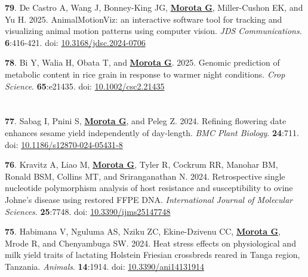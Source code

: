 \documentclass[margin,line,10pt]{res}
\newenvironment{list1}{
  \begin{list}{\ding{113}}{%
      \setlength{\itemsep}{0in}
      \setlength{\parsep}{0in} \setlength{\parskip}{0in}
      \setlength{\topsep}{0in} \setlength{\partopsep}{0in} 
      \setlength{\leftmargin}{0.17in}}}{\end{list}}
\begin{document}
\begin{resume}
\begin{list1}
  \vspace{0.5cm}

  \item [{\bf 79}.] De Castro A, Wang J, Bonney-King JG, \textbf{\underline{Morota G}}, Miller-Cushon EK, and Yu H. 2025. AnimalMotionViz: an interactive software tool for tracking and visualizing animal motion patterns using computer vision. \emph{JDS Communications}. \textbf{6}:416-421. doi: \textcolor{blue}{\href{https://doi.org/10.3168/jdsc.2024-0706}{10.3168/jdsc.2024-0706}}


  \vspace{0.5cm}

\item  [{\bf 78}.] Bi Y, Walia H, Obata T, and \textbf{\underline{Morota G}}. 2025. Genomic prediction of metabolic content in rice grain in response to warmer night conditions. \emph{Crop Science}. \textbf{65}:e21435. doi: \textcolor{blue}{\href{https://doi.org/10.1002/csc2.21435}{10.1002/csc2.21435}}

\end{list1}



\section{}
\begin{list1}


  \item  [{\bf 77}.]  Sabag I, Pnini S, \textbf{\underline{Morota G}}, and Peleg Z. 2024. Refining flowering date enhances sesame yield independently of day-length. \emph{BMC Plant Biology}. \textbf{24}:711. doi: \textcolor{blue}{\href{https://doi.org/10.1186/s12870-024-05431-8}{10.1186/s12870-024-05431-8}} 

  \vspace{0.5cm}

  \item  [{\bf 76}.] Kravitz A, Liao M, \textbf{\underline{Morota G}}, Tyler R, Cockrum RR, Manohar BM, Ronald BSM, Collins MT, and Sriranganathan N. 2024. Retrospective single nucleotide polymorphism analysis of host resistance and susceptibility to ovine Johne’s disease using restored FFPE DNA. \emph{International Journal of Molecular Sciences}. \textbf{25}:7748. doi: \textcolor{blue}{\href{https://doi.org/10.3390/ijms25147748}{10.3390/ijms25147748}} 

  \vspace{0.5cm}


  \item  [{\bf 75}.] Habimana V, Nguluma AS, Nziku ZC, Ekine-Dzivenu CC, \textbf{\underline{Morota G}}, Mrode R, and Chenyambuga SW. 2024. Heat stress effects on physiological and milk yield traits of lactating Holstein Friesian crossbreds reared in Tanga region, Tanzania. \emph{Animals}. \textbf{14}:1914. doi: \textcolor{blue}{\href{https://doi.org/10.3390/ani14131914}{10.3390/ani14131914}}


\end{list1}
\end{resume}
\end{document}
